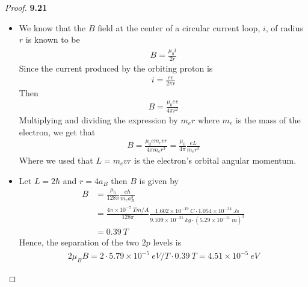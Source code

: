 \documentclass[11pt]{article}
\newcommand{\sci}[1]{\times 10^{#1}}
\theoremstyle{definition}
\begin{document}
\cleardoublepage
\begin{proof}{\textbf{9.21}}
\begin{itemize}
\item[\textbf{(a)}] We know that the $B$ field at the center of a circular
current loop, $i$, of radius $r$ is known to be
\begin{align*}
    B = \frac{\mu_0 i}{2r}
\end{align*}
Since the current produced by the orbiting proton is
\begin{align*}
    i = \frac{ev}{2\pi r}
\end{align*}
Then 
\begin{align*}
    B = \frac{\mu_0 ev}{4\pi r^2}
\end{align*}
Multiplying and dividing the expression by $m_e r$ where $m_e$ is the mass
of the electron, we get that
\begin{align*}
    B = \frac{\mu_0 e m_e v r}{4\pi m_e r^3}
    = \frac{\mu_0}{4\pi} \frac{e L}{m_e r^3}
\end{align*}
Where we used that $L = m_e vr$ is the electron's orbital angular momentum.

\item[\textbf{(b)}] Let $L = 2\hbar$ and $r = 4a_B$ then $B$ is given by
\begin{align*}
    B &= \frac{\mu_0}{128\pi} \frac{e \hbar}{m_e a_B^3}\\
    &= \frac{4\pi \sci{-7}~Tm/A}{128\pi}
    \frac{1.602 \sci{-19}~C\cdot 1.054\sci{-34}~Js}
    {9.109\sci{-31}~kg \cdot (5.29\sci{-11}~m)^3}\\
    &= 0.39 ~T
\end{align*}
Hence, the separation of the two $2p$ levels is
\begin{align*}
    2\mu_B B = 2 \cdot 5.79\sci{-5}~eV/T \cdot 0.39~T = 4.51\sci{-5}~eV 
\end{align*}
\end{itemize}
\end{proof}
\end{document}

